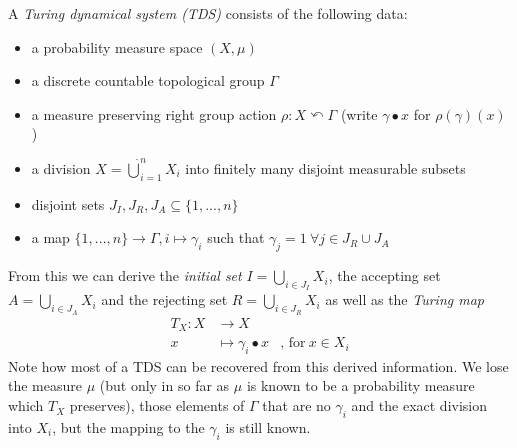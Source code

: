 \begin{Definition}
	A \emph{Turing dynamical system (TDS) } consists of the following data:
	\begin{itemize}
		\item{a probability measure space $(X,\mu)$}
		\item{a discrete countable topological group $\Gamma$}
		\item{a measure preserving right group action $\rho : X \curvearrowleft \Gamma$ (write $\gamma \bullet x$ for $\rho(\gamma)(x)$)}
		\item{a division $X = \dot\bigcup_{i=1}^n X_i$ into finitely many disjoint measurable subsets}
		\item{disjoint sets $J_I, J_R, J_A \subseteq \{1,...,n\}$}
		\item{a map $\{1,...,n\} \to \Gamma, i \mapsto \gamma_i$ such that $\gamma_j = 1~\forall j \in J_R \cup J_A$}
	\end{itemize}
\end{Definition}
From this we can derive the \emph{initial set} $I = \bigcup_{i\in J_I} X_i$, the accepting set $A = \bigcup_{i \in J_A} X_i$ and the rejecting set $R = \bigcup_{i \in J_R} X_i$ as well as the \emph{Turing map}
\begin{align*}
	T_X : X &\to X \\
	x &\mapsto \gamma_i \bullet x&\text{, for}~x \in X_i
\end{align*}
Note how most of a TDS can be recovered from this derived information.
We lose the measure $\mu$ (but only in so far as $\mu$ is known to be a probability measure which $T_X$ preserves),
those elements of $\Gamma$ that are no $\gamma_i$
and the exact division into $X_i$, but the mapping to the $\gamma_i$ is still known.
